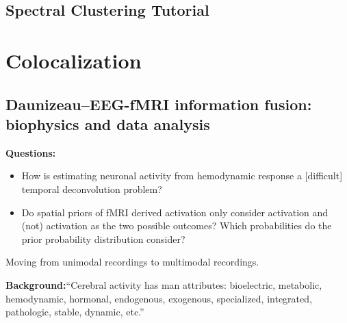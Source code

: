 \documentclass{article}
\begin{document}
        \subsection{Spectral Clustering Tutorial}
    \section{Colocalization} 
        \subsection{Daunizeau--EEG-fMRI information fusion: biophysics and data 
    analysis}
            \textbf{Questions:}
            \begin{itemize}
                \item How is estimating neuronal activity from hemodynamic
response a [difficult] temporal deconvolution problem?
                \item Do spatial priors of fMRI derived activation only consider
activation and (not) activation as the two possible outcomes? Which
probabilities do the prior probability distribution consider?
            \end{itemize}     
            Moving from unimodal recordings to multimodal recordings. 

            \textbf{Background:}``Cerebral activity has man attributes: bioelectric,
            metabolic, hemodynamic, hormonal, endogenous, exogenous, specialized, 
    integrated,
            pathologic, stable, dynamic, etc.'' 
\end{document}
